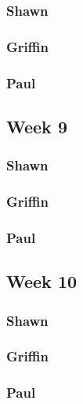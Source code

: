\documentclass[10pt,draftclsnofoot,onecolumn]{IEEEtran}
\begin{document}
\subsubsection{Shawn}
\subsubsection{Griffin}
\subsubsection{Paul}

\subsection{Week 9}
\subsubsection{Shawn}
\subsubsection{Griffin}
\subsubsection{Paul}

\subsection{Week 10}
\subsubsection{Shawn}
\subsubsection{Griffin}
\subsubsection{Paul}
\end{document}
